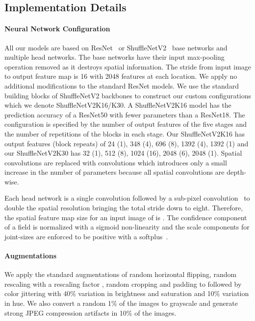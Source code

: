 \documentclass[journal]{IEEEtran}
\begin{document}
\subsection{Implementation Details}

\paragraph{Neural Network Configuration}
All our models are based on ResNet~\cite{he2016deep} or
ShuffleNetV2~\cite{ma2018shufflenet} base networks and
multiple head networks. The base networks have their input max-pooling
operation removed as it destroys spatial information. The stride from
input image to output feature map is 16 with 2048 features at each
location. We apply no additional modifications to the standard
ResNet models. We use the standard building blocks of
ShuffleNetV2 backbones to construct our custom configurations which we
denote ShuffleNetV2K16/K30. A ShuffleNetV2K16 model has the prediction
accuracy of a ResNet50 with fewer parameters than a ResNet18. The
configuration is specified by the number of output features of the five
stages and the number of repetitions of the blocks in each stage. Our
ShuffleNetV2K16 has output features (block repeats) of 24 (1), 348 (4),
696 (8), 1392 (4), 1392 (1) and our ShuffleNetV2K30 has 32 (1), 512 (8),
1024 (16), 2048 (6), 2048 (1). Spatial  convolutions are
replaced with  convolutions which introduces only a small increase
in the number of parameters because all spatial convolutions are depth-wise.

Each head network is a single  convolution followed
by a sub-pixel convolution~\cite{shi2016real} to double the spatial resolution
bringing the total stride down to eight.
Therefore, the spatial feature map size for an input image of
 is .
The confidence component of a field is normalized with a sigmoid non-linearity
and the scale components for joint-sizes are enforced to be positive with
a softplus~\cite{dugas2000incorporating}.


\paragraph{Augmentations}
We apply the standard augmentations of random horizontal flipping,
random rescaling with a rescaling factor ,
random cropping and padding to  followed by color jittering
with 40\% variation in brightness and saturation and 10\% variation in hue.
We also convert a
random 1\% of the images to grayscale and generate strong JPEG compression
artifacts in 10\% of the images.
\end{document}
